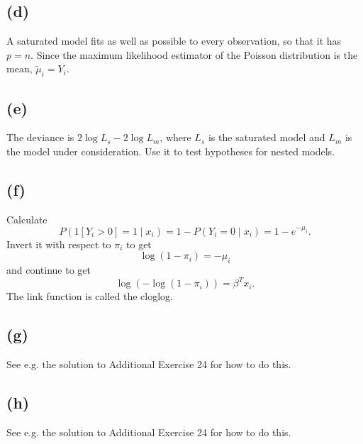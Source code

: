 \subsection*{(d)}
A saturated model fits as well as possible to every observation, so
that it has $p=n$. Since the maximum likelihood estimator of the
Poisson distribution is the mean, $\tilde{\mu}_{i}=Y_{i}$.

\subsection*{(e)}
The deviance is $2\log L_{s}-2\log L_{m}$, where $L_{s}$ is the
saturated model and $L_{m}$ is the model under consideration. Use
it to test hypotheses for nested models.

\subsection*{(f)}
Calculate 
\[
P(1[Y_{i}>0]=1\mid x_{i})=1-P(Y_{i}=0\mid x_{i})=1-e^{-\mu_{i}}.
\]
 Invert it with respect to $\pi_{i}$ to get
\[
\log(1-\pi_{i})=-\mu_{i}
\]
and continue to get
\[
\log(-\log(1-\pi_{i}))=\beta^{T}x_{i}.
\]
The link function is called the cloglog. 

\subsection*{(g)}
See e.g. the solution to Additional Exercise 24 for how to do this.

\subsection*{(h)}
See e.g. the solution to Additional Exercise 24 for how to do this.
